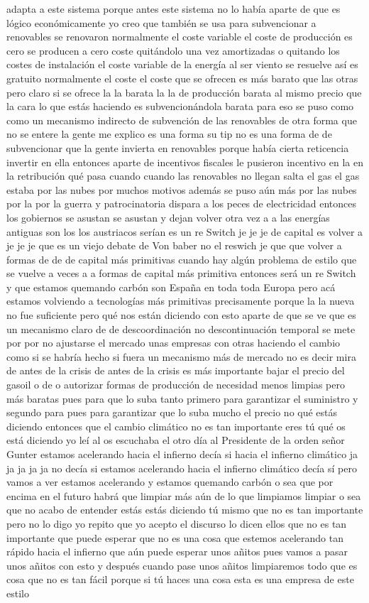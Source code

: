 adapta a este sistema porque antes este sistema no lo había aparte de que es lógico económicamente yo creo que también se usa para subvencionar a renovables se renovaron normalmente el coste variable el coste de producción es cero se producen a cero coste quitándolo una vez amortizadas o quitando los costes de instalación el coste variable de la energía al ser viento se resuelve así es gratuito normalmente el coste el coste que se ofrecen es más barato que las otras pero claro si se ofrece la la barata la la de producción barata al mismo precio que la cara lo que estás haciendo es subvencionándola barata para eso se puso como como un mecanismo indirecto de subvención de las renovables de otra forma que no se entere la gente me explico es una forma su tip no es una forma de de subvencionar que la gente invierta en renovables porque había cierta reticencia invertir en ella entonces aparte de incentivos fiscales le pusieron incentivo en la en la retribución qué pasa cuando cuando las renovables no llegan salta el gas el gas estaba por las nubes por muchos motivos además se puso aún más por las nubes por la por la guerra y patrocinatoria dispara a los peces de electricidad entonces los gobiernos se asustan se asustan y dejan volver otra vez a a las energías antiguas son los los austriacos serían es un re Switch je je je de capital es volver a je je je que es un viejo debate de Von baber no el reswich je que que volver a formas de de de capital más primitivas cuando hay algún problema de estilo que se vuelve a veces a a formas de capital más primitiva entonces será un re Switch y que estamos quemando carbón son España en toda toda Europa pero acá estamos volviendo a tecnologías más primitivas precisamente porque la la nueva no fue suficiente pero qué nos están diciendo con esto aparte de que se ve que es un mecanismo claro de de descoordinación no descontinuación temporal se mete por por no ajustarse el mercado unas empresas con otras haciendo el cambio como si se habría hecho si fuera un mecanismo más de mercado no es decir mira de antes de la crisis de antes de la crisis es más importante bajar el precio del gasoil o de o autorizar formas de producción de necesidad menos limpias pero más baratas pues para que lo suba tanto primero para garantizar el suministro y segundo para pues para garantizar que lo suba mucho el precio no qué estás diciendo entonces que el cambio climático no es tan importante eres tú qué os está diciendo yo leí al os escuchaba el otro día al Presidente de la orden señor Gunter estamos acelerando hacia el infierno decía si hacia el infierno climático ja ja ja ja ja no decía si estamos acelerando hacia el infierno climático decía sí pero vamos a ver estamos acelerando y estamos quemando carbón o sea que por encima en el futuro habrá que limpiar más aún de lo que limpiamos limpiar o sea que no acabo de entender estás estás diciendo tú mismo que no es tan importante pero no lo digo yo repito que yo acepto el discurso lo dicen ellos que no es tan importante que puede esperar que no es una cosa que estemos acelerando tan rápido hacia el infierno que aún puede esperar unos añitos pues vamos a pasar unos añitos con esto y después cuando pase unos añitos limpiaremos todo que es cosa que no es tan fácil porque si tú haces una cosa esta es una empresa de este estilo 